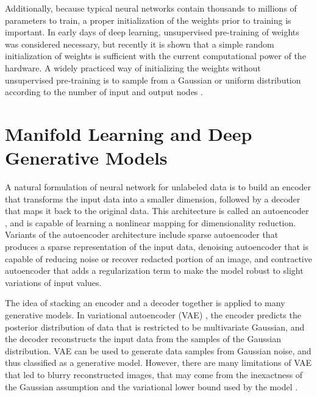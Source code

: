 Additionally, because typical neural networks contain thousands to millions of parameters to train, a proper initialization of the weights prior to training is important.
In early days of deep learning, unsupervised pre-training of weights \cite{bengio2007greedy,erhan2010pretraining} was considered necessary, but recently it is shown that a simple random initialization of weights is sufficient with the current computational power of the hardware.
A widely practiced way of initializing the weights without unsupervised pre-training is to sample from a Gaussian or uniform distribution according to the number of input and output nodes \cite{glorot2010initialization,he2015prelu}.

\section{Manifold Learning and Deep Generative Models}

A natural formulation of neural network for unlabeled data is to build an encoder that transforms the input data into a smaller dimension, followed by a decoder that maps it back to the original data.
This architecture is called an autoencoder \cite{bengio2009deeplearning}, and is capable of learning a nonlinear mapping for dimensionality reduction.
Variants of the autoencoder architecture include sparse autoencoder \cite{ng2011sparse} that produces a sparse representation of the input data, denoising autoencoder \cite{vincent2008denoising} that is capable of reducing noise or recover redacted portion of an image, and contractive autoencoder \cite{rifai2011contractive} that adds a regularization term to make the model robust to slight variations of input values.

The idea of stacking an encoder and a decoder together is applied to many generative models.
In variational autoencoder (VAE) \cite{kingma2013vae}, the encoder predicts the posterior distribution of data that is restricted to be multivariate Gaussian, and the decoder reconstructs the input data from the samples of the Gaussian distribution.
VAE can be used to generate data samples from Gaussian noise, and thus classified as a generative model.
However, there are many limitations of VAE that led to blurry reconstructed images, that may come from the inexactness of the Gaussian assumption and the variational lower bound used by the model \cite{doersch2016tutorial}.

